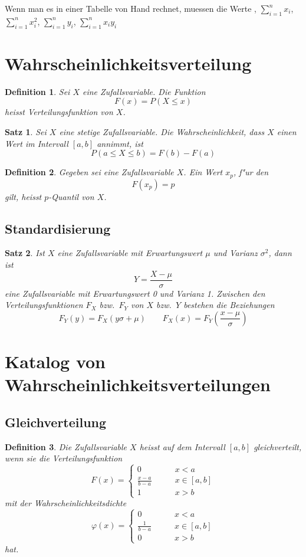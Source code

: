 \documentclass[ngerman, a4paper, 10pt, twocolumn, DIV20, headings=small]{scrartcl}
\newtheorem{definition}{Definition}
\newtheorem{satz}{Satz}
\begin{document}
Wenn man es in einer Tabelle von Hand rechnet, muessen die Werte , $\sum_{i=1}^nx_i$, $\sum_{i=1}^nx_i^2$, $\sum_{i=1}^ny_i$, $\sum_{i=1}^nx_iy_i$

\section{Wahrscheinlichkeitsverteilung}

\begin{definition}
Sei $X$ eine Zufallsvariable. Die Funktion
\[
F(x) = P(X\le x)
\]
heisst Verteilungsfunktion von $X$. 
\end{definition}

\begin{satz}
  Sei $X$ eine stetige Zufallsvariable. Die Wahrscheinlichkeit, dass $X$ einen Wert im Intervall $[a,b]$ annimmt, ist
\[
P(a \le X \le b) = F(b) - F(a)
\]
\end{satz}

\begin{definition}
  Gegeben sei eine Zufallsvariable 
$X$. Ein Wert $x_p$, f"ur den
\[
F(x_p) = p
\]
gilt, heisst $p$-Quantil von $X$.
\end{definition}

\subsection{Standardisierung}
\label{sec:standardisierung}


\begin{satz}
\label{satz-standardisierung}
Ist $X$ eine Zufallsvariable mit Erwartungswert $\mu$ und
Varianz $\sigma^2$, dann ist
\[
Y=\frac{X-\mu}\sigma
\]
eine Zufallsvariable mit Erwartungswert 0 und Varianz 1.
Zwischen den Verteilungsfunktionen $F_X$ bzw.~$F_Y$ von $X$ bzw.~$Y$ 
bestehen die Beziehungen
\[
F_Y(y)=F_X(y\sigma+\mu)\qquad F_X(x)=F_Y\left(\frac{x-\mu}\sigma\right)
\]

\end{satz}

\section{Katalog von Wahrscheinlichkeitsverteilungen}

\subsection{Gleichverteilung}

\begin{definition}Die Zufallsvariable $X$ heisst auf dem Intervall
$[a,b]$ gleichverteilt, wenn sie die Verteilungsfunktion
\[
F(x)=\begin{cases}
0&\qquad x< a\\
\frac{x-a}{b-a}&\qquad x\in[a,b]\\
1&\qquad x> b
\end{cases}
\]
mit der Wahrscheinlichkeitsdichte
\[
\varphi(x)=\begin{cases}
0&\qquad x< a\\
\frac1{b-a}&\qquad x\in[a,b]\\
0&\qquad x> b
\end{cases}
\]
hat.
\end{definition}
\end{document}
